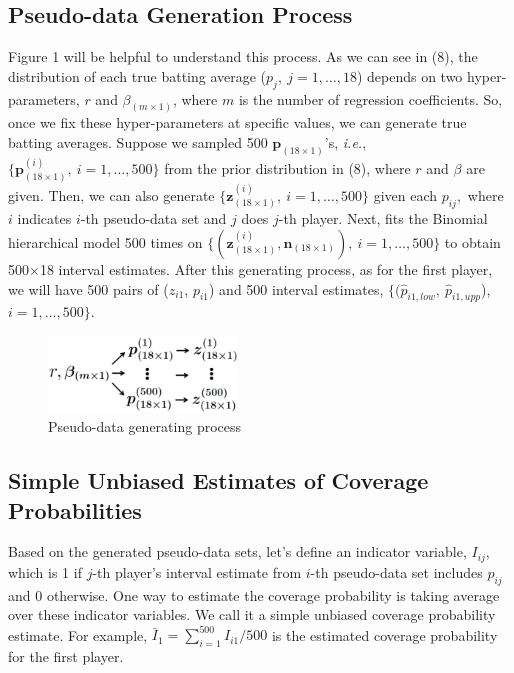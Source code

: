 \documentclass[article]{jss}
\begin{document}
\subsection{Pseudo-data Generation Process}
Figure 1 will be helpful to understand this process. As we can see in (8), the distribution of each true batting average ($p_{j},~j=1,\ldots, 18$) depends on two hyper-parameters, $r$ and $\beta_{(m\times1)}$, where $m$ is the number of regression coefficients. So, once we fix these hyper-parameters at specific values, we can generate true batting averages. Suppose we sampled 500 $\mathbf{p}_{(18\times1)}$'s, \emph{i.e.}, $\{\mathbf{p}^{(i)}_{(18\times1)},~i=1, \ldots, 500\}$ from the prior distribution in (8), where $r$ and $\beta$ are given. Then, we can also generate $\{\mathbf{z}^{(i)}_{(18\times1)},~i=1, \ldots, 500\}$ given each $p_{ij},$ where $i$ indicates $i$-th pseudo-data set and $j$ does $j$-th player. Next,  fits the Binomial hierarchical model 500 times on $\{(\mathbf{z}^{(i)}_{(18\times1)}, \mathbf{n}_{(18 \times 1)}),~i=1, \ldots, 500\}$ to obtain 500$\times$18 interval estimates.  After this generating process, as for the first player, we will have 500 pairs of ($z_{i1}$, $p_{i1}$) and 500 interval estimates, $\{(\hat{p}_{i1, low}, ~\hat{p}_{i1, upp}$), $i=1, \ldots, 500\}$.
\begin{figure}[h]
\begin{center}
\includegraphics[width=5cm]{process.png}
\caption{Pseudo-data generating process}
\end{center}
\end{figure}

\subsection{Simple Unbiased Estimates of Coverage Probabilities}
Based on the generated pseudo-data sets, let's define an indicator variable, $I_{ij}$, which is 1 if $j$-th player's interval estimate from $i$-th pseudo-data set includes $p_{ij}$ and 0 otherwise. One way to estimate the coverage probability is taking average over these indicator variables. We call it a simple unbiased coverage probability estimate. For example, $\bar{I}_{1}=\sum_{i=1}^{500}I_{i1}/500$ is the estimated coverage probability for the first player.
\end{document}
